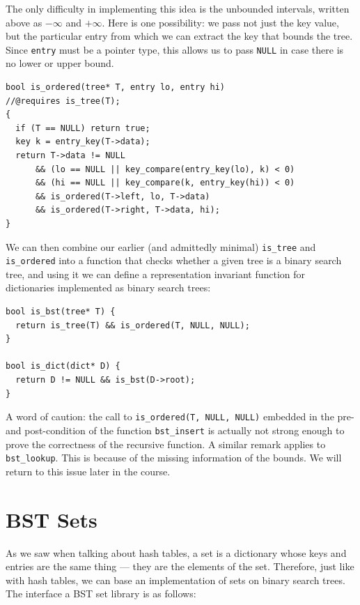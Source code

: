 The only difficulty in implementing this idea is the unbounded
intervals, written above as $-\infty$ and $+\infty$.  Here is one
possibility: we pass not just the key value, but the particular entry
from which we can extract the key that bounds the tree. Since
\lstinline'entry' must be a pointer type,
this allows us to pass \lstinline'NULL' in case there is no lower or upper
bound.
\begin{lstlisting}[language={[C0]C}]
bool is_ordered(tree* T, entry lo, entry hi)
//@requires is_tree(T);
{
  if (T == NULL) return true;
  key k = entry_key(T->data);
  return T->data != NULL
      && (lo == NULL || key_compare(entry_key(lo), k) < 0)
      && (hi == NULL || key_compare(k, entry_key(hi)) < 0)
      && is_ordered(T->left, lo, T->data)
      && is_ordered(T->right, T->data, hi);
}
\end{lstlisting}

We can then combine our earlier (and admittedly minimal)
\lstinline'is_tree' and \lstinline'is_ordered' into a function that
checks whether a given tree is a binary search tree, and using it we
can define a representation invariant function for dictionaries
implemented as binary search trees:

\begin{lstlisting}[language={[C0]C}]
bool is_bst(tree* T) {
  return is_tree(T) && is_ordered(T, NULL, NULL);
}

bool is_dict(dict* D) {
  return D != NULL && is_bst(D->root);
}
\end{lstlisting}

A word of caution: the call to \lstinline'is_ordered(T, NULL, NULL)'
embedded in the pre- and
post-condition of the function \lstinline'bst_insert' is actually not
strong enough to prove the correctness of the recursive function.  A
similar remark applies to \lstinline'bst_lookup'.  This is because of
the missing information of the bounds.  We will return to this issue
later in the course.


\section{BST Sets}
\label{sec:bst:sets}

As we saw when talking about hash tables, a set is a dictionary whose
keys and entries are the same thing --- they are the elements of the
set.  Therefore, just like with hash tables, we can base an
implementation of sets on binary search trees.  The interface a BST
set library is as follows:

